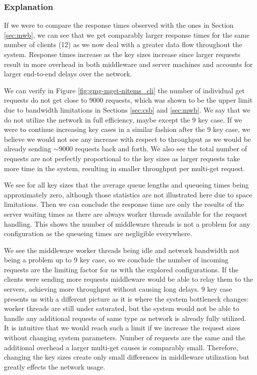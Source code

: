 \documentclass[11pt,a4paper]{article}
\begin{document}
\subsubsection{Explanation} \label{sec:gmg-true-exp}
\par If we were to compare the response times observed with the ones in Section \ref{sec:mwb}, we can see that we get comparably larger response times for the same number of clients (12) as we now deal with a greater data flow throughout the system. Response times increase as the key sizes increase since larger requests result in more overhead in both middleware and server machines and accounts for larger end-to-end delays over the network.
\par We can verify in Figure \ref{fig:gmg-mget-nitems_cli} the number of individual get requests do not get close to 9000 requests, which was shown to be the upper limit due to bandwidth limitations in Sections \ref{sec:csb} and \ref{sec:mwb}. We say that we do not utilize the network in full efficiency, maybe except the 9 key case. If we were to continue increasing key cases in a similar fashion after the 9 key case, we believe we would not see any increase with respect to throughput as we would be already sending $\sim 9000$ requests back and forth. We also see the total number of requests are not perfectly  proportional to the key sizes as larger requests take more time in the system, resulting in smaller throughput per multi-get request.
\par We see for all key sizes that the average queue lengths and queueing times being approximately zero, although those statistics are not illustrated here due to space limitations. Then we can conclude the response time are only the results of the server waiting times as there are always worker threads available for the request handling. This shows the number of middleware threads is not a problem for any configuration as the queueing times are negligible everywhere.
\par We see the middleware worker threads being idle and network bandwidth not being a problem up to 9 key case, so we conclude the number of incoming requests are the limiting factor for us with the explored configurations. If the clients were sending more requests middleware would be able to relay them to the servers, achieving more throughput without causing long delays. 9 key case presents us with a different picture as it is where the system bottleneck changes: worker threads are still under saturated, but the system would not be able to handle any additional requests of same type as network is already fully utilized. It is intuitive that we would reach such a limit if we increase the request sizes without changing system parameters. Number of requests are the same and the additional overhead a larger multi-get causes is comparably small. Therefore, changing the key sizes create only small differences in middleware utilization but greatly effects the network usage.
\end{document}
